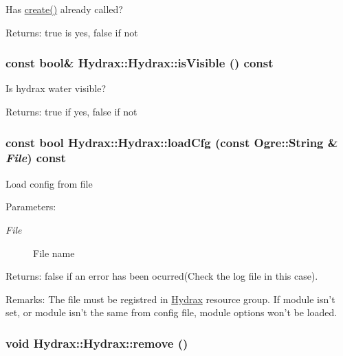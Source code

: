 Has \hyperlink{class_hydrax_1_1_hydrax_af840e19208614533a6b344e32965ee2}{create()} already called? \begin{Desc}
\item[Returns:]true is yes, false if not \end{Desc}
\hypertarget{class_hydrax_1_1_hydrax_b573f6c6e548a4c501b80a465659ab61}{
\subsubsection[{isVisible}]{\setlength{\rightskip}{0pt plus 5cm}const bool\& Hydrax::Hydrax::isVisible () const}}
\label{class_hydrax_1_1_hydrax_b573f6c6e548a4c501b80a465659ab61}


Is hydrax water visible? \begin{Desc}
\item[Returns:]true if yes, false if not \end{Desc}
\hypertarget{class_hydrax_1_1_hydrax_1a9a011581dc097e3928511632b534da}{
\subsubsection[{loadCfg}]{\setlength{\rightskip}{0pt plus 5cm}const bool Hydrax::Hydrax::loadCfg (const Ogre::String \& {\em File}) const}}
\label{class_hydrax_1_1_hydrax_1a9a011581dc097e3928511632b534da}


Load config from file \begin{Desc}
\item[Parameters:]
\begin{description}
\item[{\em File}]File name \end{description}
\end{Desc}
\begin{Desc}
\item[Returns:]false if an error has been ocurred(Check the log file in this case). \end{Desc}
\begin{Desc}
\item[Remarks:]The file must be registred in \hyperlink{class_hydrax_1_1_hydrax}{Hydrax} resource group. If module isn't set, or module isn't the same from config file, module options won't be loaded. \end{Desc}
\hypertarget{class_hydrax_1_1_hydrax_02c9bf8f5576332fc836b4929e738529}{
\subsubsection[{remove}]{\setlength{\rightskip}{0pt plus 5cm}void Hydrax::Hydrax::remove ()}}
\label{class_hydrax_1_1_hydrax_02c9bf8f5576332fc836b4929e738529}


